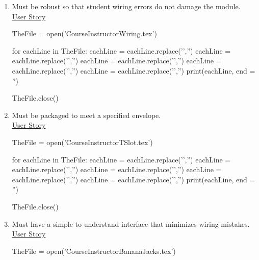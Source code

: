 \begin{itemize}
\begin{enumerate}
%
	
	
\bigskip
 	
		\item Must be robust so that student wiring errors do not damage the module.\\[.5cm] \underline{User Story}\\	
		
\begin{python}
TheFile = open('CourseInstructorWiring.tex')

for eachLine in TheFile:
    eachLine = eachLine.replace('','')
    eachLine = eachLine.replace('','')
    eachLine = eachLine.replace('','')
    eachLine = eachLine.replace('','')
    eachLine = eachLine.replace('','')
    print(eachLine, end = '')
		
TheFile.close()
\end{python}
\bigskip
	
	
		\item Must be packaged to meet a specified envelope.\\[.5cm] \underline{User Story} \\
		
\begin{python}
TheFile = open('CourseInstructorTSlot.tex')

for eachLine in TheFile:
    eachLine = eachLine.replace('','')
    eachLine = eachLine.replace('','')
    eachLine = eachLine.replace('','')
    eachLine = eachLine.replace('','')
    eachLine = eachLine.replace('','')
    print(eachLine, end = '')
		
TheFile.close()
\end{python}
\bigskip

		\item Must have a simple to understand interface that minimizes wiring mistakes.\\[.5cm] \underline{User Story}\\
		
\begin{python}
TheFile = open('CourseInstructorBananaJacks.tex')


\end{python}
\end{enumerate}
\end{itemize}
